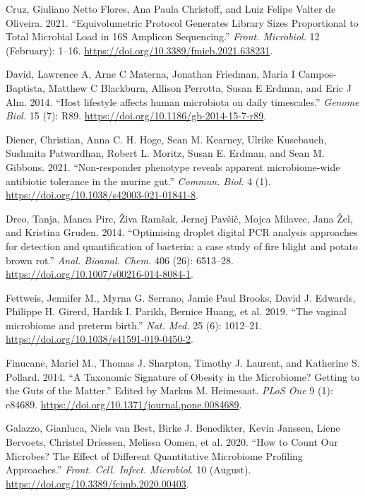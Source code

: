 \documentclass[
]{article}
\newlength{\cslhangindent}
\newlength{\cslentryspacingunit} %
\newenvironment{CSLReferences}[2] %
 {%
  \setlength{\parindent}{0pt}
  \ifodd #1
  \let\oldpar\par
  \def\par{\hangindent=\cslhangindent\oldpar}
  \fi
  \setlength{\parskip}{#2\cslentryspacingunit}
 }%
 {}
\begin{document}
\begin{CSLReferences}{1}{0}
\leavevmode{}%
Cruz, Giuliano Netto Flores, Ana Paula Christoff, and Luiz Felipe Valter de Oliveira. 2021. {``{Equivolumetric Protocol Generates Library Sizes Proportional to Total Microbial Load in 16S Amplicon Sequencing}.''} \emph{Front. Microbiol.} 12 (February): 1--16. \url{https://doi.org/10.3389/fmicb.2021.638231}.

\leavevmode{}%
David, Lawrence A, Arne C Materna, Jonathan Friedman, Maria I Campos-Baptista, Matthew C Blackburn, Allison Perrotta, Susan E Erdman, and Eric J Alm. 2014. {``{Host lifestyle affects human microbiota on daily timescales}.''} \emph{Genome Biol.} 15 (7): R89. \url{https://doi.org/10.1186/gb-2014-15-7-r89}.

\leavevmode{}%
Diener, Christian, Anna C. H. Hoge, Sean M. Kearney, Ulrike Kusebauch, Sushmita Patwardhan, Robert L. Moritz, Susan E. Erdman, and Sean M. Gibbons. 2021. {``{Non-responder phenotype reveals apparent microbiome-wide antibiotic tolerance in the murine gut}.''} \emph{Commun. Biol.} 4 (1). \url{https://doi.org/10.1038/s42003-021-01841-8}.

\leavevmode{}%
Dreo, Tanja, Manca Pirc, Živa Ramšak, Jernej Pavšič, Mojca Milavec, Jana Žel, and Kristina Gruden. 2014. {``{Optimising droplet digital PCR analysis approaches for detection and quantification of bacteria: a case study of fire blight and potato brown rot}.''} \emph{Anal. Bioanal. Chem.} 406 (26): 6513--28. \url{https://doi.org/10.1007/s00216-014-8084-1}.

\leavevmode{}%
Fettweis, Jennifer M., Myrna G. Serrano, Jamie Paul Brooks, David J. Edwards, Philippe H. Girerd, Hardik I. Parikh, Bernice Huang, et al. 2019. {``{The vaginal microbiome and preterm birth}.''} \emph{Nat. Med.} 25 (6): 1012--21. \url{https://doi.org/10.1038/s41591-019-0450-2}.

\leavevmode{}%
Finucane, Mariel M., Thomas J. Sharpton, Timothy J. Laurent, and Katherine S. Pollard. 2014. {``{A Taxonomic Signature of Obesity in the Microbiome? Getting to the Guts of the Matter}.''} Edited by Markus M. Heimesaat. \emph{PLoS One} 9 (1): e84689. \url{https://doi.org/10.1371/journal.pone.0084689}.

\leavevmode{}%
Galazzo, Gianluca, Niels van Best, Birke J. Benedikter, Kevin Janssen, Liene Bervoets, Christel Driessen, Melissa Oomen, et al. 2020. {``{How to Count Our Microbes? The Effect of Different Quantitative Microbiome Profiling Approaches}.''} \emph{Front. Cell. Infect. Microbiol.} 10 (August). \url{https://doi.org/10.3389/fcimb.2020.00403}.


\end{CSLReferences}
\end{document}
